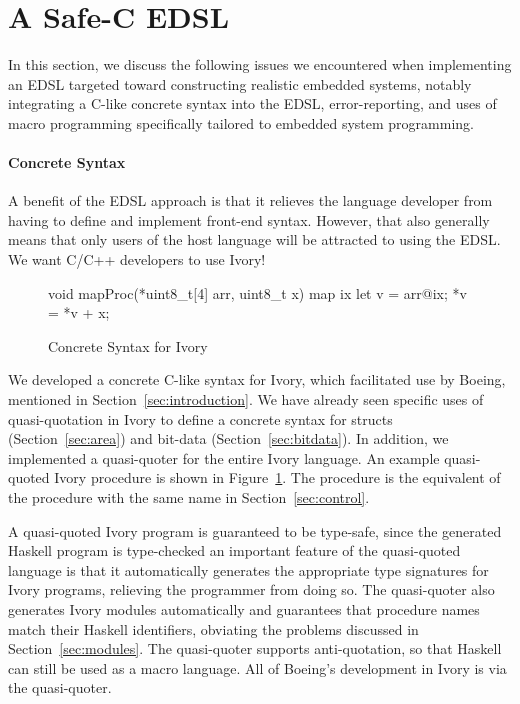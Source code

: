 \section{A Safe-C EDSL}
\label{sec:edsl}

In this section, we discuss the following issues we encountered when
implementing an EDSL targeted toward constructing realistic embedded
systems, notably integrating a C-like concrete syntax into the EDSL,
error-reporting, and uses of macro programming specifically tailored
to embedded system programming.

\paragraph{Concrete Syntax}

A benefit of the EDSL approach is that it relieves the language developer from
having to define and implement front-end syntax. However, that also generally
means that only users of the host language will be attracted to using the EDSL.
We want C/C++ developers to use Ivory!

\begin{figure}[h!]
\begin{code}
void mapProc(*uint8_t[4] arr, uint8_t x) {
  map ix {
    let v = arr@ix;
    *v = *v + x;
  }
}
\end{code}
  \caption{Concrete Syntax for Ivory}
  \label{fig:concrete}
\end{figure}


We developed a concrete C-like syntax for Ivory, which facilitated use by
Boeing, mentioned in Section~\ref{sec:introduction}. We have
already seen specific uses of quasi-quotation in Ivory to define a concrete
syntax for structs (Section~\ref{sec:area}) and bit-data
(Section~\ref{sec:bitdata}). In addition, we implemented a quasi-quoter for the entire
Ivory language. An example quasi-quoted Ivory procedure is shown in
Figure~\ref{fig:concrete}. The procedure is the equivalent of the procedure with
the same name in Section~\ref{sec:control}.

A quasi-quoted Ivory program is guaranteed to be type-safe, since the generated
Haskell program is type-checked an important feature of the quasi-quoted
language is that it automatically generates the appropriate type signatures for
Ivory programs, relieving the programmer from doing so. The quasi-quoter also
generates Ivory modules automatically and guarantees that procedure names match
their Haskell identifiers, obviating the problems discussed in
Section~\ref{sec:modules}. The quasi-quoter supports anti-quotation, so that
Haskell can still be used as a macro language. All of Boeing's development in
Ivory is via the quasi-quoter.

